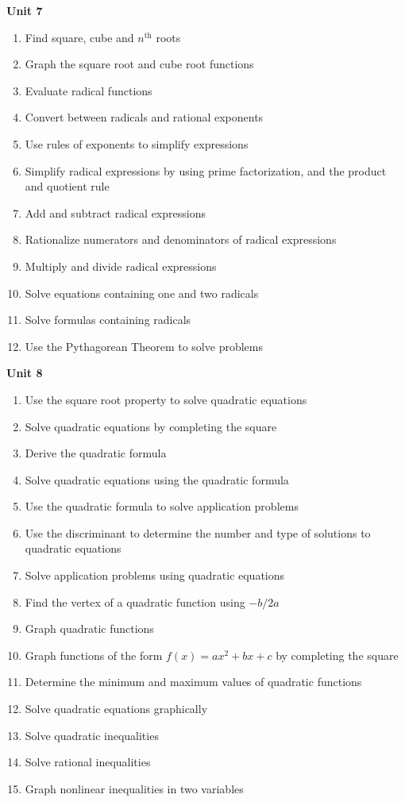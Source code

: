 \documentclass[11pt]{article}
\newenvironment{alphalist}{
\begin{enumerate}[label=(\arabic*),widest=107 ,leftmargin=25pt, itemsep=0pt]}
{\end{enumerate}}
\begin{document}
\noindent \textbf{Unit 7}
\begin{alphalist}
    \item Find square, cube and $n^\mathrm{th}$  roots
    \item Graph the square root and cube root functions
    \item Evaluate radical functions
    \item Convert between radicals and rational exponents
    \item Use rules of exponents to simplify expressions
    \item Simplify radical expressions by using prime factorization, and the product and quotient rule
    \item Add and subtract radical expressions
    \item Rationalize numerators and denominators of radical expressions
    \item Multiply and divide radical expressions
    \item Solve equations containing one and two radicals
    \item Solve formulas containing radicals
    \item Use the Pythagorean Theorem to solve problems 
\end{alphalist}
\noindent \textbf{Unit 8}
\begin{alphalist}
    \item Use the square root property to solve quadratic equations
    \item Solve quadratic equations by completing the square
    \item Derive the quadratic formula
    \item Solve quadratic equations using the quadratic formula
    \item Use the quadratic formula to solve application problems
    \item Use the discriminant to determine the number and type of solutions to quadratic equations
    \item Solve application problems using quadratic equations
    \item Find the vertex of a quadratic function using $-b/2a$
    \item Graph quadratic functions
    \item Graph functions of the form $f(x) = ax^2 + bx + c$ by completing the square
    \item Determine the minimum and maximum values of quadratic functions
    \item Solve quadratic equations graphically
    \item Solve quadratic inequalities
    \item Solve rational inequalities
    \item Graph nonlinear inequalities in two variables
\end{alphalist}
\end{document}
